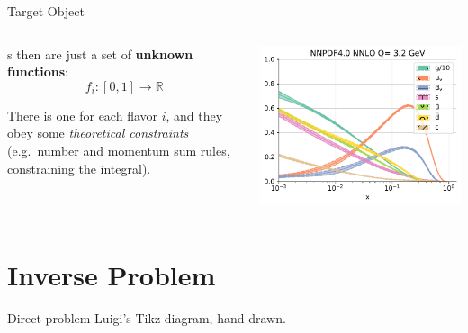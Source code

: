 \documentclass[9pt]{beamer}
\begin{document}
\begin{frame}{Target Object}
    \begin{columns}
        \begin{column}{0.5\textwidth}
            \pdf{}s then are just a set of \textbf{unknown functions}:
            \begin{equation*}
                f_i: [0, 1] \to \mathbb{R}
            \end{equation*}
            \vspace*{10pt}

            There is one for each flavor $i$, and they obey some
            \textit{theoretical constraints} (e.g.\ number and momentum sum
            rules, constraining the integral).
        \end{column}
        \begin{column}{0.5\textwidth}
            \begin{tcolorbox}
                \includegraphics[width=\textwidth]{pdfs_pdg_Qs0_plot_flavours}
            \end{tcolorbox}
        \end{column}
    \end{columns}
\end{frame}

\section{Inverse Problem}

\begin{frame}{Direct problem}
    Luigi's Tikz diagram, hand drawn.
\end{frame}
\end{document}
